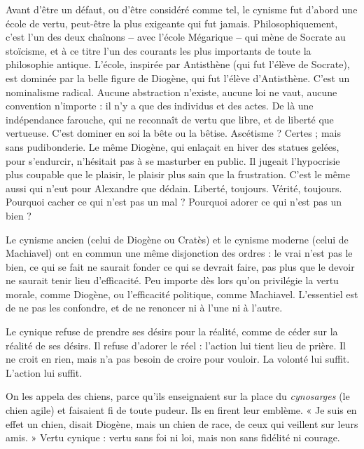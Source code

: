 Avant d’être un défaut, ou d’être considéré comme tel, le cynisme fut
d’abord une école de vertu, peut-être la plus exigeante qui fut jamais.
Philosophiquement, c’est l’un des deux chaînons {\bf --} avec l’école Mégarique {\bf --} qui mène
de Socrate au stoïcisme, et à ce titre l’un des courants les plus importants de
toute la philosophie antique. L'école, inspirée par Antisthène (qui fut l'élève de
Socrate), est dominée par la belle figure de Diogène, qui fut l’élève d’Antisthène.
C’est un nominalisme radical. Aucune abstraction n’existe, aucune loi
ne vaut, aucune convention n'importe : il n’y a que des individus et des actes.
De là une indépendance farouche, qui ne reconnaît de vertu que libre, et de
liberté que vertueuse. C’est dominer en soi la bête ou la bêtise. Ascétisme ?
Certes ; mais sans pudibonderie. Le même Diogène, qui enlaçait en hiver des
statues gelées, pour s’endurcir, n’hésitait pas à se masturber en public. Il jugeait
l’hypocrisie plus coupable que le plaisir, le plaisir plus sain que la frustration.
C’est le même aussi qui n’eut pour Alexandre que dédain. Liberté, toujours.
Vérité, toujours. Pourquoi cacher ce qui n’est pas un mal ? Pourquoi adorer ce
qui n’est pas un bien ?

Le cynisme ancien (celui de Diogène ou Cratès) et le cynisme moderne
(celui de Machiavel) ont en commun une même disjonction des ordres : le vrai
n’est pas le bien, ce qui se fait ne saurait fonder ce qui se devrait faire, pas plus
que le devoir ne saurait tenir lieu d’efficacité. Peu importe dès lors qu’on privilégie
la vertu morale, comme Diogène, ou l'efficacité politique, comme
Machiavel. L'essentiel est de ne pas les confondre, et de ne renoncer ni à l’une
ni à l’autre.

Le cynique refuse de prendre ses désirs pour la réalité, comme de céder sur
la réalité de ses désirs. Il refuse d’adorer le réel : l’action lui tient lieu de prière.
Il ne croit en rien, mais n’a pas besoin de croire pour vouloir. La volonté lui
suffit. L'action lui suffit.

On les appela des chiens, parce qu’ils enseignaient sur la place du {\it cynosarges}
(le chien agile) et faisaient fi de toute pudeur. Ils en firent leur emblème. « Je
suis en effet un chien, disait Diogène, mais un chien de race, de ceux qui
veillent sur leurs amis. » Vertu cynique : vertu sans foi ni loi, mais non sans
fidélité ni courage.

